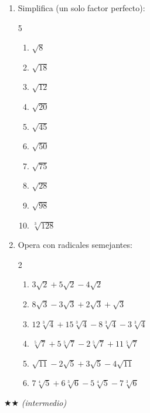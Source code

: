 \documentclass[11pt, letterpaper]{article}
\begin{document}
\begin{enumerate}[label=\textbf{\arabic*.}, leftmargin=*]
  \item Simplifica (un solo factor perfecto):
  \begin{multicols}{5}
  \begin{enumerate}[label=\alph*)]
    \item $\sqrt{8}$
    \item $\sqrt{18}$
    \item $\sqrt{12}$
    \item $\sqrt{20}$
    \item $\sqrt{45}$
    \item $\sqrt{50}$
    \item $\sqrt{75}$
    \item $\sqrt{28}$
    \item $\sqrt{98}$
    \item $\sqrt[3]{128}$
  \end{enumerate}
  \end{multicols}

  \item Opera con radicales semejantes:
  \begin{multicols}{2}
  \begin{enumerate}[label=\alph*)]
    \item $3\sqrt{2}+5\sqrt{2}-4\sqrt{2}$
    \item $8\sqrt{3}-3\sqrt{3}+2\sqrt{3}+\sqrt{3}$
    \item $12\sqrt[3]{4}+15\sqrt[3]{4}-8\sqrt[3]{4}-3\sqrt[3]{4}$
    \item $\sqrt[5]{7}+5\sqrt[5]{7}-2\sqrt[5]{7}+11\sqrt[5]{7}$
    \item $\sqrt{11}-2\sqrt{5}+3\sqrt{5}-4\sqrt{11}$
    \item $7\sqrt[4]{5}+6\sqrt[3]{6}-5\sqrt[4]{5}-7\sqrt[3]{6}$
  \end{enumerate}
  \end{multicols}
\end{enumerate}

$\bigstar\bigstar$ \textit{(intermedio)}
\end{document}
